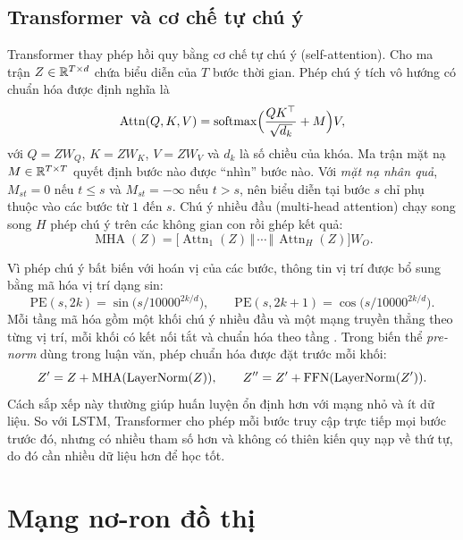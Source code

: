 \subsection{Transformer và cơ chế tự chú ý}

Transformer \cite{vaswani2017} thay phép hồi quy bằng cơ chế tự chú ý (self-attention). Cho ma trận $Z\in\mathbb{R}^{T\times d}$ chứa biểu diễn của $T$ bước thời gian. Phép chú ý tích vô hướng có chuẩn hóa được định nghĩa là
\begin{equation}
\operatorname{Attn}(Q,K,V)=\operatorname{softmax}\!\Big(\frac{QK^{\top}}{\sqrt{d_k}}+M\Big)V,
\label{eq:attn}
\end{equation}
với $Q=ZW_Q$, $K=ZW_K$, $V=ZW_V$ và $d_k$ là số chiều của khóa. Ma trận mặt nạ $M\in\mathbb{R}^{T\times T}$ quyết định bước nào được ``nhìn'' bước nào. Với \emph{mặt nạ nhân quả}, $M_{st}=0$ nếu $t\le s$ và $M_{st}=-\infty$ nếu $t>s$, nên biểu diễn tại bước $s$ chỉ phụ thuộc vào các bước từ $1$ đến $s$. Chú ý nhiều đầu (multi-head attention) chạy song song $H$ phép chú ý trên các không gian con rồi ghép kết quả:
\begin{equation}
\operatorname{MHA}(Z)=\big[\operatorname{Attn}_1(Z)\,\Vert\,\cdots\,\Vert\,\operatorname{Attn}_H(Z)\big]W_O .
\end{equation}

Vì phép chú ý bất biến với hoán vị của các bước, thông tin vị trí được bổ sung bằng mã hóa vị trí dạng sin:
\begin{equation}
\mathrm{PE}(s,2k)=\sin\!\big(s/10000^{2k/d}\big),\qquad \mathrm{PE}(s,2k+1)=\cos\!\big(s/10000^{2k/d}\big).
\label{eq:pe}
\end{equation}
Mỗi tầng mã hóa gồm một khối chú ý nhiều đầu và một mạng truyền thẳng theo từng vị trí, mỗi khối có kết nối tắt và chuẩn hóa theo tầng \cite{ba2016}. Trong biến thể \emph{pre-norm} dùng trong luận văn, phép chuẩn hóa được đặt trước mỗi khối:
\begin{equation}
Z'=Z+\operatorname{MHA}(\operatorname{LayerNorm}(Z)),\qquad Z''=Z'+\operatorname{FFN}(\operatorname{LayerNorm}(Z')).
\label{eq:prenorm}
\end{equation}
Cách sắp xếp này thường giúp huấn luyện ổn định hơn với mạng nhỏ và ít dữ liệu. So với LSTM, Transformer cho phép mỗi bước truy cập trực tiếp mọi bước trước đó, nhưng có nhiều tham số hơn và không có thiên kiến quy nạp về thứ tự, do đó cần nhiều dữ liệu hơn để học tốt.

\section{Mạng nơ-ron đồ thị}
\label{sec:lt-gnn}

